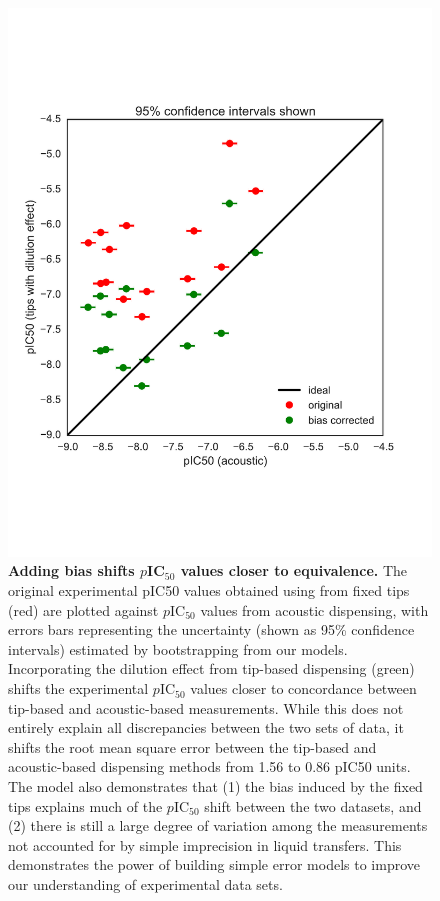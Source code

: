 \documentclass[aps,pre,twocolumn,nofootinbib,superscriptaddress,linenumbers]{revtex4-1}
\begin{document}
\begin{figure}[tb]
    \includegraphics[width=\columnwidth]{../figures/compare-pIC50-bias_corrected.pdf}

  \caption{{\bf Adding bias shifts $p$IC$_{50}$ values closer to equivalence.}
  The original experimental pIC50 values obtained using from fixed tips (red) are plotted against $p$IC$_{50}$ values from acoustic dispensing, with errors bars representing the uncertainty (shown as 95\% confidence intervals) estimated by bootstrapping from our models. 
  Incorporating the dilution effect from tip-based dispensing (green) shifts the experimental $p$IC$_{50}$ values closer to concordance between tip-based and acoustic-based measurements. 
  While this does not entirely explain all discrepancies between the two sets of data, it shifts the root mean square error between the tip-based and acoustic-based dispensing methods from 1.56 to 0.86 pIC50 units.
  The model also demonstrates that (1) the bias induced by the fixed tips explains much of the $p$IC$_{50}$ shift between the two datasets, and (2) there is still a large degree of variation among the measurements not accounted for by simple imprecision in liquid transfers.
  This demonstrates the power of building simple error models to improve our understanding of experimental data sets.
  }
  \label{fig:IC50_bias}
\end{figure}
\end{document}
